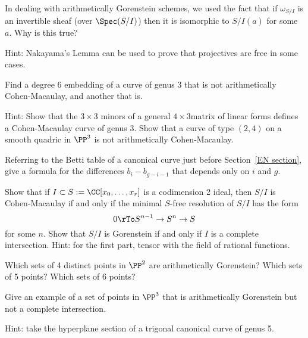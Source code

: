 \begin{exercise}
In dealing with arithmetically Gorenstein schemes, we used the fact that if $\omega_{S/I}$ is an invertible
sheaf (over $\Spec(S/I)$) then it is isomorphic to $S/I(a)$ for some $a$. Why is this true?

Hint: Nakayama's Lemma can be used to prove that projectives are free in some cases.
\end{exercise}


\begin{exercise}
Find a degree 6 embedding of a curve of genus 3 that is not arithmetically Cohen-Macaulay, and another that is.

Hint: Show that the $3\times 3$ minors of a general $4\times 3$matrix of linear forms defines a Cohen-Macaulay curve
of genus 3. Show that a curve of type $(2,4)$ on a smooth quadric in $\PP^3$ is not arithmetically Cohen-Macaulay.
\end{exercise}

\begin{exercise}
Referring to the Betti table of a canonical curve just before Section~\ref{EN section}, give a formula
for the differences $b_i- b_{g-i-1}$ that depends only on $i$ and $g$.
\end{exercise}

\begin{exercise}
 Show that if $I \subset S := \CC[x_0,\dots, x_r]$ is a codimension 2 ideal, then $S/I$ is Cohen-Macaulay if and only
 if the minimal $S$-free resolution of $S/I$ has the form
 $$
 0\rTo S^{n-1} \to S^n \to S
 $$
 for some $n$. Show that $S/I$ is Gorenstein if and only if $I$ is a complete intersection. Hint: for the first part, tensor with
 the field of rational functions. 
\end{exercise}

\begin{exercise}
Which sets of 4 distinct points in $\PP^2$ are arithmetically Gorenstein? Which sets of 5 points? Which sets of 6 points?
\end{exercise}

\begin{exercise}
 Give an example of a set of points in $\PP^3$ that is arithmetically Gorenstein but not a complete intersection. 
 
 Hint: take the 
hyperplane section of a trigonal canonical curve of genus 5.
\end{exercise}

